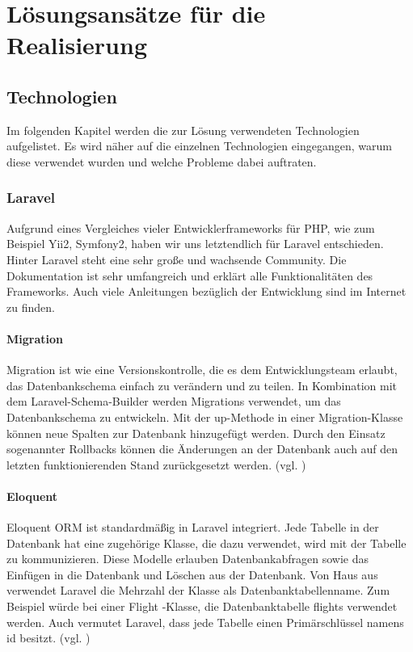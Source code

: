 \chapter{Lösungsansätze für die Realisierung}

\section{Technologien}
Im folgenden Kapitel werden die zur Lösung verwendeten Technologien aufgelistet. Es wird näher auf die einzelnen Technologien eingegangen, warum diese verwendet wurden und welche Probleme dabei auftraten.

\subsection{Laravel}
Aufgrund eines Vergleiches vieler Entwicklerframeworks für PHP, wie zum Beispiel Yii2, Symfony2, haben wir uns letztendlich für Laravel entschieden. Hinter Laravel steht eine sehr große und wachsende Community. Die Dokumentation ist sehr umfangreich und erklärt alle Funktionalitäten des Frameworks. Auch viele Anleitungen bezüglich der Entwicklung sind im Internet zu finden.

\subsubsection{Migration}
Migration ist wie eine Versionskontrolle, die es dem Entwicklungsteam erlaubt, das Datenbankschema einfach zu verändern und zu teilen. In Kombination mit dem Laravel-Schema-Builder werden Migrations verwendet, um das Datenbankschema zu entwickeln. Mit der up-Methode in einer Migration-Klasse können neue Spalten zur Datenbank hinzugefügt werden. Durch den Einsatz sogenannter Rollbacks können die Änderungen an der Datenbank auch auf den letzten funktionierenden Stand zurückgesetzt werden. (vgl. \cite{migration})

\subsubsection{Eloquent}
Eloquent ORM ist standardmäßig in Laravel integriert. Jede Tabelle in der Datenbank hat eine zugehörige Klasse, die dazu verwendet, wird mit der Tabelle zu kommunizieren. Diese Modelle erlauben Datenbankabfragen sowie das Einfügen in die Datenbank und Löschen aus der Datenbank. Von Haus aus verwendet Laravel die Mehrzahl der Klasse als Datenbanktabellenname. Zum Beispiel würde bei einer \glqq Flight\grqq{} -Klasse, die Datenbanktabelle \glqq flights\grqq{} verwendet werden. Auch vermutet Laravel, dass jede Tabelle einen Primärschlüssel namens \glqq id\grqq{} besitzt. (vgl. \cite{eloquent}) 

